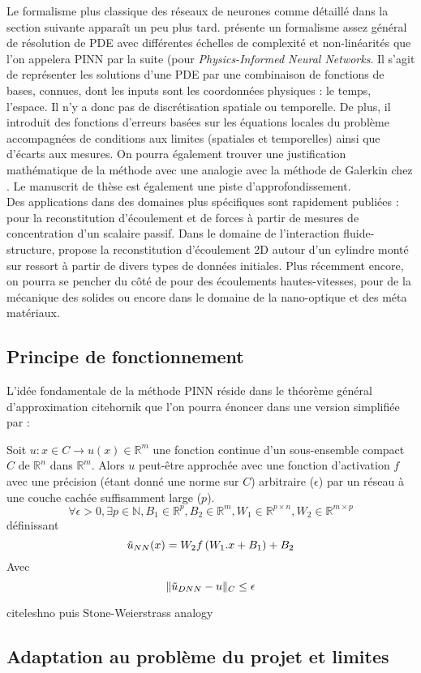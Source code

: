 Le formalisme plus classique des réseaux de neurones comme détaillé dans la section suivante apparaît un peu plus tard. \cite{raissiPhysicsinformedNeuralNetworks2019} présente un formalisme assez général de résolution de PDE avec différentes échelles de complexité et non-linéarités que l'on appelera PINN par la suite (pour \textit{Physics-Informed Neural Networks}. Il s'agit de représenter les solutions d'une PDE par une combinaison de fonctions de bases, connues, dont les inputs sont les coordonnées physiques : le temps, l'espace. Il n'y a donc pas de discrétisation spatiale ou temporelle. De plus, il introduit des fonctions d'erreurs basées sur les équations locales du problème accompagnées de conditions aux limites (spatiales et temporelles) ainsi que d'écarts aux mesures. On pourra également trouver une justification mathématique de la méthode avec une analogie avec la méthode de Galerkin chez \cite{al-aradiSolvingNonlinearHighDimensional}. Le manuscrit de thèse \cite{rudyComputationalMethodsSystem2019} est également une piste d'approfondissement.\\

Des applications dans des domaines plus spécifiques sont rapidement publiées : \cite{raissiHiddenFluidMechanics2018} pour la reconstitution d'écoulement et de forces à partir de mesures de concentration d'un scalaire passif. Dans le domaine de l'interaction fluide-structure, \cite{raissiDeepLearningVortexinduced2019a} propose la reconstitution d'écoulement 2D autour d'un cylindre monté sur ressort à partir de divers types de données initiales. Plus récemment encore, on pourra se pencher du côté de \cite{maoPhysicsinformedNeuralNetworks2020} pour des écoulements hautes-vitesses, \cite{haghighatDeepLearningFramework2020,luExtractionMechanicalProperties2020} pour de la mécanique des solides ou encore \cite{chenPhysicsinformedNeuralNetworks2020} dans le domaine de la nano-optique et des méta matériaux.\


\subsection{Principe de fonctionnement}

L'idée fondamentale de la méthode PINN réside dans le théorème général d'approximation cite{hornik} que l'on pourra énoncer dans une version simplifiée par : 

\begin{theorem}
Soit $u : x\in  C \rightarrow u(x) \in \mathbb{R}^m$ une fonction continue d'un sous-ensemble compact $C$ de $\mathbb{R}^n$ dans $\mathbb{R}^m$. Alors $u$ peut-être approchée avec une fonction d'activation $f$ avec une précision (étant donné une norme sur $C$) arbitraire ($\epsilon$) par un réseau à une couche cachée suffisamment large ($p$).
$$ \forall \epsilon > 0, \exists p\in \mathbb{N}, B_1 \in \mathbb{R}^p, B_2 \in \mathbb{R}^m, W_1 \in \mathbb{R}^{p\times n}, W_2 \in \mathbb{R}^{m \times p} $$
définissant
$$ \Tilde{u}_{NN} (x) = W_2 f\left( W_1 . x + B_1  \right) + B_2 $$
Avec 
$$ \| \Tilde{u}_{DNN} - u \|_{C} \leq \epsilon $$
\end{theorem}



cite{leshno} puis Stone-Weierstrass analogy

\subsection{Adaptation au problème du projet et limites}

